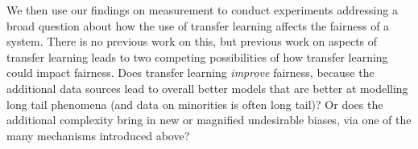 
We then use our findings on measurement to conduct experiments addressing a broad question about how the use of transfer learning affects the fairness of a system. There is no previous work on this, but previous work on aspects of transfer learning leads to two competing possibilities of how transfer learning could impact fairness. Does transfer learning \textit{improve} fairness, because the additional data sources lead to overall better models that are better at modelling long tail phenomena \cite{} (and data on minorities is often long tail)? Or does the additional complexity bring in new or magnified undesirable biases, via one of the many mechanisms introduced above? 


